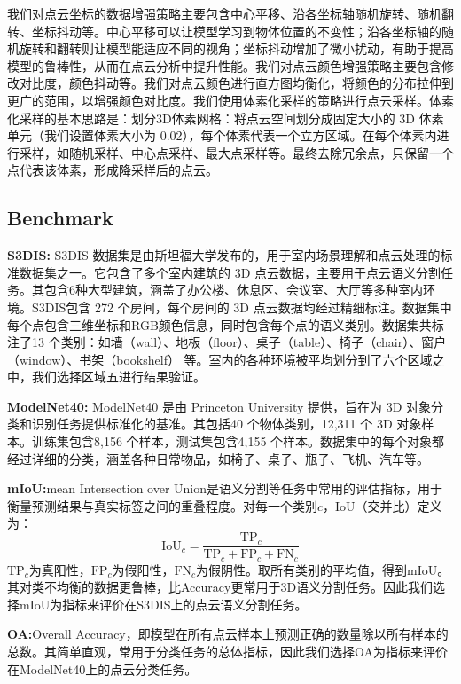\documentclass[preprint,12pt]{elsarticle}
\begin{document}
我们对点云坐标的数据增强策略主要包含中心平移、沿各坐标轴随机旋转、随机翻转、坐标抖动等。中心平移可以让模型学习到物体位置的不变性；沿各坐标轴的随机旋转和翻转则让模型能适应不同的视角；坐标抖动增加了微小扰动，有助于提高模型的鲁棒性，从而在点云分析中提升性能。我们对点云颜色增强策略主要包含修改对比度，颜色抖动等。我们对点云颜色进行直方图均衡化，将颜色的分布拉伸到更广的范围，以增强颜色对比度。我们使用体素化采样的策略进行点云采样。体素化采样的基本思路是：划分3D体素网格：将点云空间划分成固定大小的 3D 体素单元（我们设置体素大小为 0.02），每个体素代表一个立方区域。在每个体素内进行采样，如随机采样、中心点采样、最大点采样等。最终去除冗余点，只保留一个点代表该体素，形成降采样后的点云。


\subsection{Benchmark}
\textbf{S3DIS:}
S3DIS 数据集是由斯坦福大学发布的，用于室内场景理解和点云处理的标准数据集之一。它包含了多个室内建筑的 3D 点云数据，主要用于点云语义分割任务。其包含6种大型建筑，涵盖了办公楼、休息区、会议室、大厅等多种室内环境。S3DIS包含 272 个房间，每个房间的 3D 点云数据均经过精细标注。数据集中每个点包含三维坐标和RGB颜色信息，同时包含每个点的语义类别。数据集共标注了13 个类别：如墙（wall）、地板（floor）、桌子（table）、椅子（chair）、窗户（window）、书架（bookshelf） 等。室内的各种环境被平均划分到了六个区域之中，我们选择区域五进行结果验证。


\textbf{ModelNet40:}
ModelNet40 是由 Princeton University 提供，旨在为 3D 对象分类和识别任务提供标准化的基准。其包括40 个物体类别，12,311 个 3D 对象样本。训练集包含8,156 个样本，测试集包含4,155 个样本。数据集中的每个对象都经过详细的分类，涵盖各种日常物品，如椅子、桌子、瓶子、飞机、汽车等。


\textbf{mIoU:}mean Intersection over Union是语义分割等任务中常用的评估指标，用于衡量预测结果与真实标签之间的重叠程度。对每一个类别$c$，IoU（交并比）定义为：\begin{equation}\mathrm{IoU}_c=\frac{\mathrm{TP}_c}{\mathrm{TP}_c+\mathrm{FP}_c+\mathrm{FN}_c}\end{equation}
$\mathrm{TP}_{c}$为真阳性，$\mathrm{FP}_{c}$为假阳性，$\mathrm{FN}_{c}$为假阴性。取所有类别的平均值，得到mIoU。其对类不均衡的数据更鲁棒，比Accuracy更常用于3D语义分割任务。因此我们选择mIoU为指标来评价在S3DIS上的点云语义分割任务。

\textbf{OA:}Overall Accuracy，即模型在所有点云样本上预测正确的数量除以所有样本的总数。其简单直观，常用于分类任务的总体指标，因此我们选择OA为指标来评价在ModelNet40上的点云分类任务。
\end{document}
